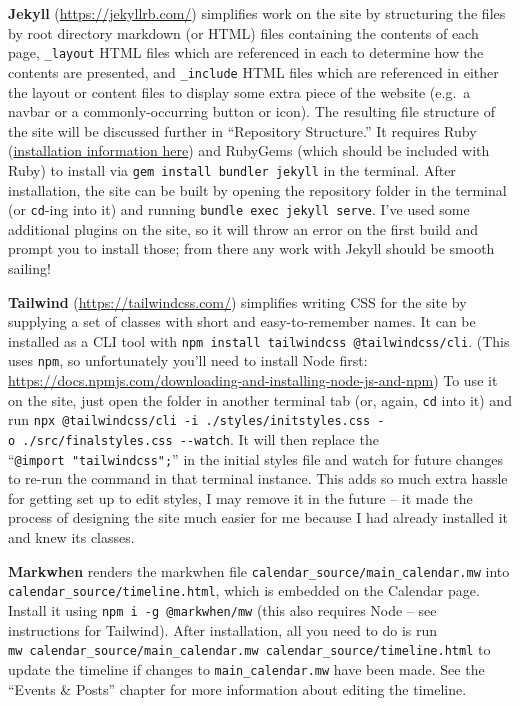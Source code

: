 \documentclass[
]{book}
\begin{document}
\textbf{Jekyll} (\url{https://jekyllrb.com/}) simplifies work on the site by structuring the files by root directory markdown (or HTML) files containing the contents of each page, \texttt{\_layout} HTML files which are referenced in each to determine how the contents are presented, and \texttt{\_include} HTML files which are referenced in either the layout or content files to display some extra piece of the website (e.g.~a navbar or a commonly-occurring button or icon). The resulting file structure of the site will be discussed further in ``Repository Structure.'' It requires Ruby (\href{https://www.ruby-lang.org/en/documentation/installation/}{installation information here}) and RubyGems (which should be included with Ruby) to install via \texttt{gem\ install\ bundler\ jekyll} in the terminal. After installation, the site can be built by opening the repository folder in the terminal (or \texttt{cd}-ing into it) and running \texttt{bundle\ exec\ jekyll\ serve}. I've used some additional plugins on the site, so it will throw an error on the first build and prompt you to install those; from there any work with Jekyll should be smooth sailing!

\textbf{Tailwind} (\url{https://tailwindcss.com/}) simplifies writing CSS for the site by supplying a set of classes with short and easy-to-remember names. It can be installed as a CLI tool with \texttt{npm\ install\ tailwindcss\ @tailwindcss/cli}. (This uses \texttt{npm}, so unfortunately you'll need to install Node first: \url{https://docs.npmjs.com/downloading-and-installing-node-js-and-npm}) To use it on the site, just open the folder in another terminal tab (or, again, \texttt{cd} into it) and run \texttt{npx\ @tailwindcss/cli\ -i\ ./styles/initstyles.css\ -o\ ./src/finalstyles.css\ -\/-watch}. It will then replace the ``\texttt{@import\ "tailwindcss";}'' in the initial styles file and watch for future changes to re-run the command in that terminal instance. This adds so much extra hassle for getting set up to edit styles, I may remove it in the future -- it made the process of designing the site much easier for me because I had already installed it and knew its classes.

\textbf{Markwhen} renders the markwhen file \texttt{calendar\_source/main\_calendar.mw} into \texttt{calendar\_source/timeline.html}, which is embedded on the Calendar page. Install it using \texttt{npm\ i\ -g\ @markwhen/mw} (this also requires Node -- see instructions for Tailwind). After installation, all you need to do is run \texttt{mw\ calendar\_source/main\_calendar.mw\ calendar\_source/timeline.html} to update the timeline if changes to \texttt{main\_calendar.mw} have been made. See the ``Events \& Posts'' chapter for more information about editing the timeline.


\end{document}
